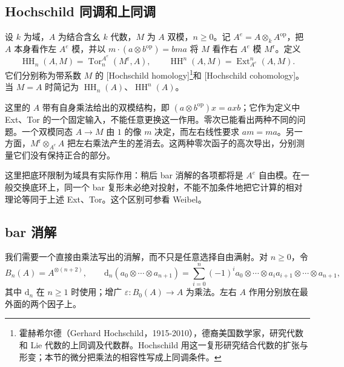 \subsection{Hochschild 同调和上同调}
\label{b4:subsec:1201:02}

\begin{definition}\label{b4:def:hochschild-derived}
	设 \(k\) 为域，\(A\) 为结合含幺 \(k\) 代数，\(M\) 为 \(A\) 双模，\(n\ge0\)。记 \(A^e=A\otimes_kA^{\mathrm{op}}\)，把 \(A\) 本身看作左 \(A^e\) 模，并以 \(m\cdot(a\otimes b^{\mathrm{op}})=bma\) 将 \(M\) 看作右 \(A^e\) 模 \(M^{\mathrm r}\)。定义
	\[
		\operatorname{HH}_n(A,M)=\operatorname{Tor}^{A^e}_n(M^{\mathrm r},A), \qquad \operatorname{HH}^n(A,M)=\operatorname{Ext}_{A^e}^n(A,M).
	\]
	它们分别称为带系数 \(M\) 的 [Hochschild homology]\footnote{霍赫希尔德（Gerhard Hochschild，1915-2010），德裔美国数学家，研究代数和 Lie 代数的上同调及代数群。Hochschild 用这一复形研究结合代数的扩张与形变；本节的微分把乘法的相容性写成上同调条件。}和 [Hochschild cohomology]。当 \(M=A\) 时简记为 \(\operatorname{HH}_n(A)\)、\(\operatorname{HH}^n(A)\)。
\end{definition}

这里的 \(A\) 带有自身乘法给出的双模结构，即 \((a\otimes b^{\mathrm{op}})x=axb\)；它作为定义中 Ext、Tor 的一个固定输入，不能任意更换这一作用。零次已能看出两种不同的问题。一个双模同态 \(A\to M\) 由 \(1\) 的像 \(m\) 决定，而左右线性要求 \(am=ma\)。另一方面，\(M^{\mathrm r}\otimes_{A^e}A\) 把左右乘法产生的差消去。这两种零次函子的高次导出，分别测量它们没有保持正合的部分。

\ProseParagraphBreak
这里把底环限制为域具有实际作用：稍后 bar 消解的各项都将是 \(A^e\) 自由模。在一般交换底环上，同一个 bar 复形未必绝对投射，不能不加条件地把它计算的相对理论等同于上述 Ext、Tor。这个区别可参看 Weibel\cite[Lemma 9.1.3, Corollary 9.1.5]{Weibel1994HomologicalAlgebra}。

\subsection{bar 消解}
\label{b4:subsec:1201:03}

我们需要一个直接由乘法写出的消解，而不只是任意选择自由满射。对 \(n\ge0\)，令
\[
	B_n(A)=A^{\otimes(n+2)},\qquad \mathrm{d}_n(a_0\otimes\cdots\otimes a_{n+1}) =\sum_{i=0}^{n}(-1)^i a_0\otimes\cdots\otimes a_i a_{i+1}\otimes\cdots\otimes a_{n+1},
\]
其中 \(\mathrm{d}_n\) 在 \(n\ge1\) 时使用；增广 \(\varepsilon:B_0(A)\to A\) 为乘法。左右 \(A\) 作用分别放在最外面的两个因子上。


